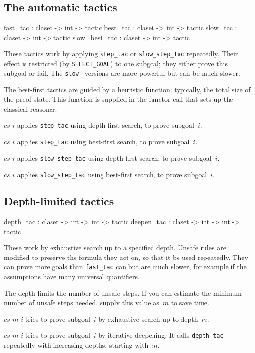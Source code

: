 \subsection{The automatic tactics}
\begin{ttbox} 
fast_tac      : claset -> int -> tactic
best_tac      : claset -> int -> tactic
slow_tac      : claset -> int -> tactic
slow_best_tac : claset -> int -> tactic
\end{ttbox}
These tactics work by applying {\tt step_tac} or {\tt slow_step_tac}
repeatedly.  Their effect is restricted (by {\tt SELECT_GOAL}) to one subgoal;
they either prove this subgoal or fail.  The {\tt slow_} versions are more
powerful but can be much slower.  

The best-first tactics are guided by a heuristic function: typically, the
total size of the proof state.  This function is supplied in the functor call
that sets up the classical reasoner.
\begin{ttdescription}
\item[\ttindexbold{fast_tac} $cs$ $i$] applies {\tt step_tac} using
depth-first search, to prove subgoal~$i$.

\item[\ttindexbold{best_tac} $cs$ $i$] applies {\tt step_tac} using
best-first search, to prove subgoal~$i$.

\item[\ttindexbold{slow_tac} $cs$ $i$] applies {\tt slow_step_tac} using
depth-first search, to prove subgoal~$i$.

\item[\ttindexbold{slow_best_tac} $cs$ $i$] applies {\tt slow_step_tac} using
best-first search, to prove subgoal~$i$.
\end{ttdescription}


\subsection{Depth-limited tactics}
\begin{ttbox} 
depth_tac  : claset -> int -> int -> tactic
deepen_tac : claset -> int -> int -> tactic
\end{ttbox}
These work by exhaustive search up to a specified depth.  Unsafe rules are
modified to preserve the formula they act on, so that it be used repeatedly.
They can prove more goals than {\tt fast_tac} can but are much
slower, for example if the assumptions have many universal quantifiers.

The depth limits the number of unsafe steps.  If you can estimate the minimum
number of unsafe steps needed, supply this value as~$m$ to save time.
\begin{ttdescription}
\item[\ttindexbold{depth_tac} $cs$ $m$ $i$] 
tries to prove subgoal~$i$ by exhaustive search up to depth~$m$.

\item[\ttindexbold{deepen_tac} $cs$ $m$ $i$] 
tries to prove subgoal~$i$ by iterative deepening.  It calls {\tt depth_tac}
repeatedly with increasing depths, starting with~$m$.
\end{ttdescription}


